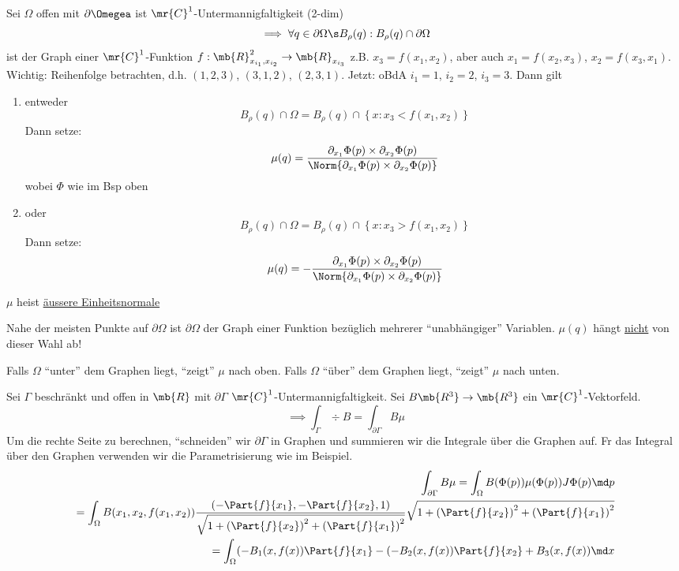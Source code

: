 \begin{Def}
  Sei $\Omega$ offen mit $\partial\Omegea$ ist $\mr{C}^1$-Untermannigfaltigkeit (2-dim) 
  \[\implies \forall q\in \partial\Omega\s B_\rho(q): B_\rho(q)\cap \partial\Omega\]
  ist der Graph einer $\mr{C}^1$-Funktion $f:\mb{R}^2_{x_{i_1}, x_{i_2}}\to\mb{R}_{x_{i_3}}$
  z.B. $x_3=f(x_1,x_2)$, aber auch $x_1=f(x_2,x_3)$, $x_2=f(x_3,x_1)$.
  Wichtig: Reihenfolge betrachten, d.h. $(1,2,3)$, $(3,1,2)$, $(2,3,1)$.
  Jetzt: oBdA $i_1=1$, $i_2=2$, $i_3=3$. Dann gilt
  \begin{enumerate}
    \item entweder
      \[B_\rho(q)\cap\Omega=B_\rho(q)\cap\left\{ x:x_3<f(x_1,x_2) \right\} \]
      Dann setze:
      \[\mu(q)=\frac{\partial_{x_1}\Phi(p) \times \partial_{x_2}\Phi(p)}{\Norm{\partial_{x_1}\Phi(p) \times \partial_{x_2}\Phi(p)}}\]
      wobei $\Phi$ wie im Bsp oben
    \item oder 
      \[B_\rho(q)\cap\Omega=B_\rho(q)\cap\left\{ x:x_3>f(x_1,x_2) \right\} \]
      Dann setze:
      \[\mu(q)=-\frac{\partial_{x_1}\Phi(p) \times \partial_{x_2}\Phi(p)}{\Norm{\partial_{x_1}\Phi(p) \times \partial_{x_2}\Phi(p)}}\]
  \end{enumerate}
  $\mu$ heist \ul{äussere Einheitsnormale}
\end{Def}
\begin{Bem}
  Nahe der meisten Punkte auf $\partial\Omega$ ist $\partial\Omega$ der Graph einer Funktion bezüglich mehrerer ``unabhängiger'' Variablen. $\mu(q)$ hängt \ul{nicht} von dieser Wahl ab!
\end{Bem}
\begin{Bem}
  Falls $\Omega$ ``unter'' dem Graphen liegt, ``zeigt'' $\mu$ nach oben. Falls $\Omega$ ``über'' dem Graphen liegt, ``zeigt'' $\mu$ nach unten.
\end{Bem}
\begin{Sat}
  Sei $\Gamma$ beschränkt und offen in $\mb{R}$ mit $\partial\Gamma$ $\mr{C}^1$-Untermannigfaltigkeit. Sei $B\mb{R^3}\to\mb{R^3}$ ein $\mr{C}^1$-Vektorfeld.
  \begin{equation}
    \label{e:1105301}
    \implies \int_\Gamma\div B=\int_{\partial\Gamma}B\mu
  \end{equation}
  Um die rechte Seite zu berechnen, ``schneiden'' wir $\partial\Gamma$ in Graphen und summieren wir die Integrale über die Graphen auf. Fr das Integral über den Graphen verwenden wir die Parametrisierung wie im Beispiel. %
  \begin{eqnarray*}
    \int_{\partial\Gamma}B\mu = \int_\Omega B(\Phi(p))\mu(\Phi(p))J\Phi(p)\md p\\
    =\int_\Omega B(x_1,x_2,f(x_1,x_2))\frac{\left( -\Part{f}{x_1},-\Part{f}{x_2},1 \right)}{\sqrt{1+\left( \Part{f}{x_2} \right)^2+\left( \Part{f}{x_1} \right)^2}}\sqrt{1+\left( \Part{f}{x_2} \right)^2+\left( \Part{f}{x_1} \right)^2}\\
    =\int_\Omega (-B_1(x,f(x))\Part{f}{x_1}-(-B_2(x,f(x))\Part{f}{x_2}+B_3(x,f(x))\md x
  \end{eqnarray*}
\end{Sat}
